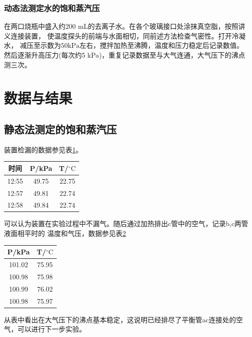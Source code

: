 \documentclass[12pt]{article}
\newcommand{\mr}[1]{\mathrm{#1}}
\def\celsius{^{\circ}\mr{C}}  %
\begin{document}
			\subsubsection{动态法测定水的饱和蒸汽压}
			在两口烧瓶中盛入约200 mL的去离子水。在各个玻璃接口处涂抹真空脂，按照讲义连接装置，
			使温度探头的前端与水面相切，同前述方法检查气密性。打开冷凝水，
			减压至示数为$50\mr{kPa}$左右，搅拌加热至沸腾，温度和压力稳定后记录数值。
			然后逐渐升高压力(每次约5 kPa)，重复记录数据至与大气连通，大气压下的沸点测三次。

	\vbox{}  
	\section{数据与结果}
 		\subsection{静态法测定的饱和蒸汽压}
		装置检漏的数据参见表\ref{static detection}。
		\begin{table}[h]
			\centering
			\begin{tabular}{ccc}
				\toprule
				时间 & P/kPa & T/$\celsius$ \\
				\midrule
				12:55 & 49.75 & 22.75  \\
				12:57 & 49.81 & 22.74  \\
				12:58 & 49.84 & 22.74  \\
				\bottomrule
			\end{tabular}
			\label{static detection}
		\end{table}
		可以认为装置在实验过程中不漏气。随后通过加热排出c管中的空气，记录b,c两管液面相平时的
		温度和气压，数据参见表\ref{Tb of CCl4 at atm}
		\begin{table}[h]
			\centering
			\begin{tabular}{cc}
				\toprule
				P/kPa & T/$\celsius$ \\
				\midrule
				 101.02 & 75.95  \\
				 100.98 & 75.98  \\
				 100.99 & 76.02  \\
				 100.98 & 75.97  \\
				\bottomrule
			\end{tabular}
			\label{Tb of CCl4 at atm}
		\end{table}
		从表中看出在大气压下的沸点基本稳定，这说明已经排尽了平衡管ac连接处的空气，可以进行下一步实验。
\end{document}
